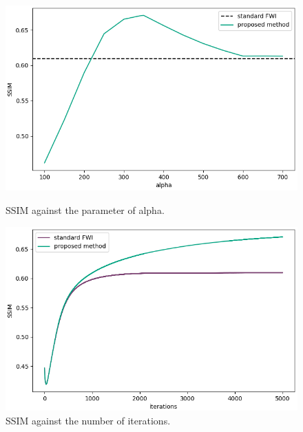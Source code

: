 \begin{figure}[htbp]
    \centering
    \begin{minipage}{70mm}
        \centering
        \includegraphics[width=\linewidth]{public/alpha-ssim}
        \vspace{-8mm}
        \caption{SSIM against the parameter of alpha.}
        \label{fig:alpha-ssim}
    \end{minipage}
    \hspace{10mm}
    \begin{minipage}{70mm}  %
        \centering
        \includegraphics[width=\linewidth]{public/iters-ssim}
        \vspace{-8mm}
        \caption{SSIM against the number of iterations.}
        \label{fig:iters-ssim}
    \end{minipage}
\vspace{-\baselineskip}
\vspace{2mm}
\end{figure}



